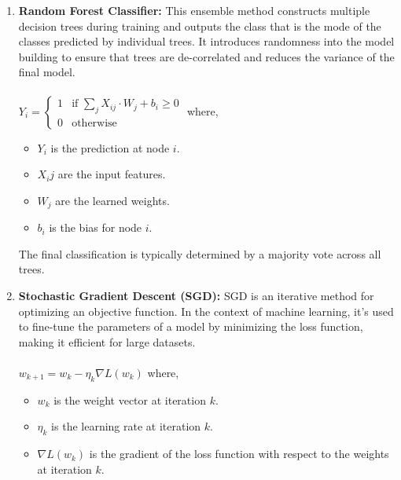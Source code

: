 \documentclass[12pt]{article}
\begin{document}
\begin{enumerate}
    \item \textbf{Random Forest Classifier:} This ensemble method constructs multiple decision trees during training and outputs the class that is the mode of the classes predicted by individual trees. It introduces randomness into the model building to ensure that trees are de-correlated and reduces the variance of the final model.\cite{Saini_2022}
    \\\\
    $
    Y_{i} = \begin{cases} 
    1 & \text{if } \sum_{j} X_{ij} \cdot W_{j} + b_{i} \geq 0 \\
    0 & \text{otherwise} 
    \end{cases}
    $
    where,
    \begin{itemize}
    \setlength\itemsep{0.5em}
        \item $Y_i$ is the prediction at node $i$.
        \item $X_ij$ are the input features.
        \item $W_j$ are the learned weights.
        \item $b_i$ is the bias for node $i$.
    \end{itemize}
    
    The final classification is typically determined by a majority vote across all trees.

    \item \textbf{Stochastic Gradient Descent (SGD):} SGD is an iterative method for optimizing an objective function. In the context of machine learning, it's used to fine-tune the parameters of a model by minimizing the loss function, making it efficient for large datasets.\cite{Ruder_2020}
    \\\\
    $w_{k+1} = w_k - \eta_k \nabla L(w_k)$ where,
    \begin{itemize}
    \setlength\itemsep{0.5em}
        \item $w_k$ is the weight vector at iteration $k$.
        \item $\eta_k$ is the learning rate at iteration $k$.
        \item $\nabla L(w_k)$ is the gradient of the loss function with respect to the weights at iteration $k$.
    \end{itemize}
\end{enumerate}

\end{document}
